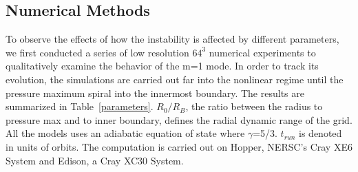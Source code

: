 \documentclass[iop,revtex4]{emulateapj}
\begin{document}
\subsection{Numerical Methods}
To observe the effects of how the instability is affected by different parameters, we first conducted a series of low resolution $64^3$ numerical experiments to qualitatively examine the behavior of the m=1 mode. In order to track its evolution, the simulations are carried out far into the nonlinear regime until the pressure maximum spiral into the innermost boundary. The results are summarized in Table~\ref{parameters}. $R_0/R_B$, the ratio between the radius to pressure max and to inner boundary, defines the radial dynamic range of the grid.  All the models uses an adiabatic equation of state where $\gamma$=5/3. $t_{run}$ is denoted in units of orbits. The computation is carried out on Hopper, NERSC's Cray XE6 System and Edison, a Cray XC30 System.
\end{document}
